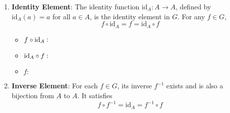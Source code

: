 \begin{remark}
\begin{enumerate}
{}
	\item \textbf{Identity Element}: The identity function \( \text{id}_A: A \to A \), defined by \( \text{id}_A(a) = a \) for all \( a \in A \), is the identity element in \( G \). For any \( f \in G \),
	\[
	f \circ \text{id}_A = f = \text{id}_A \circ f
	\]
	\begin{itemize}
		\item[] $f\circ \textnormal{id}_A:$
		\item[] $\textnormal{id}_A\circ f:$
		\item[] $f:$
	\end{itemize}
	\item \textbf{Inverse Element}: For each \( f \in G \), its inverse \( f^{-1} \) exists and is also a bijection from \( A \) to \( A \). It satisfies
	\[
	f \circ f^{-1} = \text{id}_A = f^{-1} \circ f
	\]
\end{enumerate}
\end{remark}

